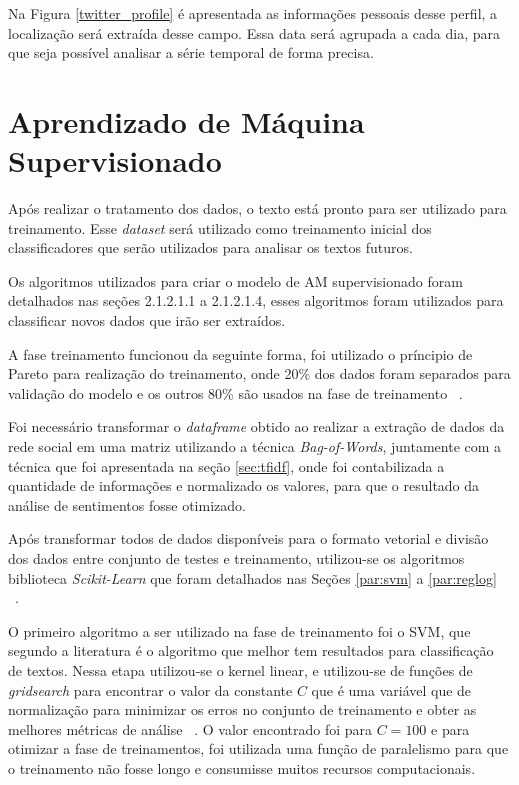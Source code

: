 %

Na Figura \ref{twitter_profile} é apresentada as informações pessoais desse perfil, a localização será extraída desse campo. Essa data será agrupada 
a cada dia, para que seja possível analisar a série temporal de forma precisa.

%

\newpage

\section{Aprendizado de Máquina Supervisionado}
\label{sec:am}

Após realizar o tratamento dos dados, o texto está pronto para ser utilizado para treinamento. Esse \textit{dataset} será utilizado 
como treinamento inicial dos classificadores que serão utilizados para analisar os textos futuros.


Os algoritmos utilizados para criar o modelo de \acrshort{AM} supervisionado foram detalhados nas seções 2.1.2.1.1 a 2.1.2.1.4, esses algoritmos foram 
utilizados para classificar novos dados que irão ser extraídos. 

A fase treinamento funcionou da seguinte forma, foi utilizado o príncipio de Pareto para realização do treinamento, onde 20\% dos dados foram 
separados para validação do modelo e os outros 80\% são usados na fase de treinamento ~\cite{jin2008pareto}. 



Foi necessário transformar o \textit{dataframe} obtido ao realizar a extração de dados da rede social em uma matriz utilizando a técnica \textit{Bag-of-Words}, 
juntamente com a técnica que foi apresentada na seção \ref{sec:tfidf}, onde foi contabilizada a quantidade de informações e normalizado os valores, para 
que o resultado da análise de sentimentos fosse otimizado.


Após transformar todos de dados disponíveis para o formato vetorial e divisão dos dados entre conjunto de testes e treinamento, utilizou-se
os algoritmos biblioteca \textit{Scikit-Learn} que foram detalhados nas Seções \ref{par:svm} a \ref{par:reglog}  ~\cite{pedregosa2011scikit}.


O primeiro algoritmo a ser utilizado na fase de treinamento foi o \acrshort{SVM}, que segundo a literatura é o algoritmo que melhor tem resultados
para classificação de textos. Nessa etapa utilizou-se o kernel linear, e utilizou-se de funções de \textit{gridsearch} para encontrar o valor da constante
$C$ que é uma variável que de normalização para minimizar os erros no conjunto de treinamento e obter as melhores métricas de análise ~\cite{lorena2007introduccao}. 
O valor encontrado foi para $C=100$ e para otimizar a fase de treinamentos, foi utilizada uma função de paralelismo para que o treinamento não fosse longo e consumisse
muitos recursos computacionais.

